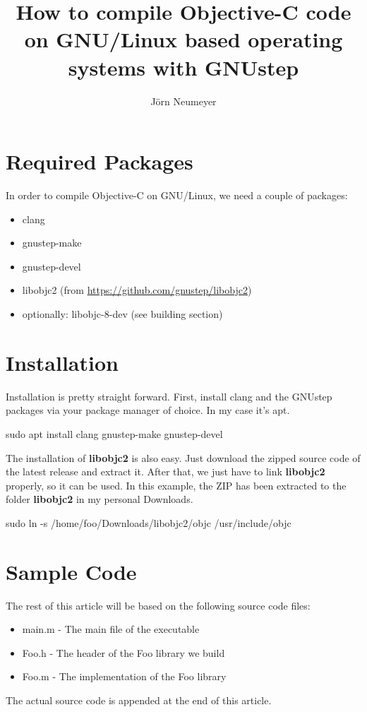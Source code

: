 \documentclass{article}
\title{How to compile Objective-C code on GNU/Linux based operating systems with GNUstep}
\author{J\"orn Neumeyer}
\begin{document}
  \maketitle
  \section{Required Packages}
  In order to compile Objective-C on GNU/Linux, we need a couple of packages:
  \begin{itemize}
    \item clang
    \item gnustep-make
    \item gnustep-devel
    \item libobjc2 (from \url{https://github.com/gnustep/libobjc2})
    \item optionally: libobjc-8-dev (see building section)
  \end{itemize}
  \section{Installation}
  Installation is pretty straight forward.
  First, install clang and the GNUstep packages via your package manager of choice. In my case it's apt.
  \begin{center}
    sudo apt install clang gnustep-make gnustep-devel
  \end{center}
  The installation of \textbf{libobjc2} is also easy.
  Just download the zipped source code of the latest release and extract it.
  After that, we just have to link \textbf{libobjc2} properly, so it can be used.
  In this example, the ZIP has been extracted to the folder \textbf{libobjc2} in my personal Downloads.
  \begin{center}
    sudo ln -s /home/foo/Downloads/libobjc2/objc /usr/include/objc
  \end{center}
  \section{Sample Code}
  The rest of this article will be based on the following source code files:
  \begin{itemize}
    \item main.m - The main file of the executable
    \item Foo.h - The header of the Foo library we build
    \item Foo.m - The implementation of the Foo library
  \end{itemize}
  The actual source code is appended at the end of this article.
\end{document}

